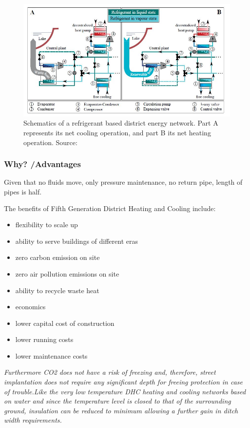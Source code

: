 \documentclass{article}
\begin{document}
\begin{figure}[h!]
\centering
\includegraphics[width=1\textwidth]{CO2schema.JPG}
\caption{Schematics of a refrigerant based district energy network. Part A represents its net cooling operation, and part B its net heating operation. Source: \cite{henchozPotentialRefrigerantBased}}
\label{fig:CO2schema}
\end{figure}

\subsubsection{Why? /Advantages}

Given that no fluids move, only pressure maintenance, no return pipe, length of pipes is half. 

The benefits of Fifth Generation District Heating and Cooling include:
\begin{itemize}
\item flexibility to scale up
\item ability to serve buildings of different eras
\item zero carbon emission on site
\item zero air pollution emissions on site
\item ability to recycle waste heat
\item economics
\item lower capital cost of construction
\item lower running costs
\item lower maintenance costs
\end{itemize}


\textit{Furthermore CO2 does not have a risk of freezing and, therefore, street implantation does not require any significant depth for freeing protection in case of trouble.Like the very low temperature DHC heating and cooling networks based on water and since the temperature level is closed to that of the surrounding ground, insulation can be reduced to minimum allowing a further gain in ditch width requirements.}\cite{henchozNovelDistrictHeating2017}
\end{document}
